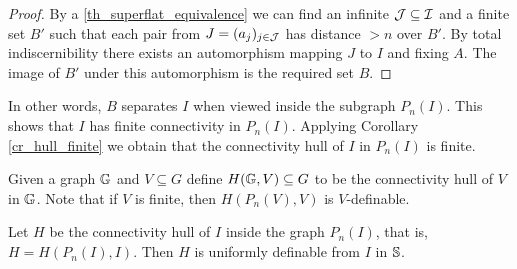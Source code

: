 \begin{proof}
  By a \ref{th_superflat_equivalence} we can find an infinite $\operatorname{\mathcal J} \subseteq \operatorname{\mathcal I}$ and a finite set $B'$
  such that each pair from $J = (a_j)_{j \in \operatorname{\mathcal J}}$ has distance $>n$ over $B'$.
  By total indiscernibility there exists an automorphism mapping $J$ to $I$ and fixing $A$.
  The image of $B'$ under this automorphism is the required set $B$.
\end{proof}

In other words, $B$ separates $I$ when viewed inside the subgraph $P_n(I)$.
This shows that $I$ has finite connectivity in $P_n(I)$.
Applying Corollary \ref{cr_hull_finite} we obtain that the connectivity hull of $I$ in $P_n(I)$ is finite.


\begin{Definition}
  Given a graph $\mathbb G$ and $V \subseteq G$ define $H(\mathbb G, V) \subseteq G$ to be the connectivity hull of $V$ in $\mathbb G$.
  Note that if $V$ is finite, then $H(P_n(V), V)$ is $V$-definable.
\end{Definition}

\begin{Lemma} \label{lm_uniform}
  Let $H$ be the connectivity hull of $I$ inside the graph $P_n(I)$, that is, $H = H(P_n(I), I)$.
  Then $H$ is uniformly definable from $I$ in $\mathbb S$.
\end{Lemma}

